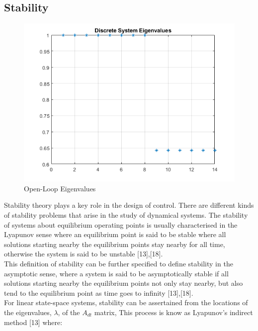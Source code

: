 \documentclass[12pt,a4paper,twoside]{report}
\begin{document}
			\subsection{Stability}
			
				\begin{figure}[h!]
					\centering
					\includegraphics[width=0.8\linewidth]{DiscreteSystemPoles.png}
					\caption{Open-Loop Eigenvalues}
					\label{fig:openloopeigenvalues}
				\end{figure}
			
				Stability theory plays a key role in the design of control. There are different kinds of stability problems that arise in the study of dynamical systems. The stability of systems about equilibrium operating points is usually characterised in the Lyapunov sense where an equilibrium point is said to be stable where all solutions starting nearby the equilibrium points stay nearby for all time, otherwise the system is said to be unstable [13],[18]. 
				\\
				This definition of stability can be further specified to define stability in the asymptotic sense, where a system is said to be asymptotically stable if all solutions starting nearby the equilibrium points not only stay nearby, but also tend to the equilibrium point as time goes to infinity [13],[18].
				\\
				For linear state-space systems, stability can be assertained from the locations of the eigenvalues, $\lambda$, of the $A_{dt}$ matrix, This process is know as Lyapunov's indirect method [13] where:
				
\end{document}
